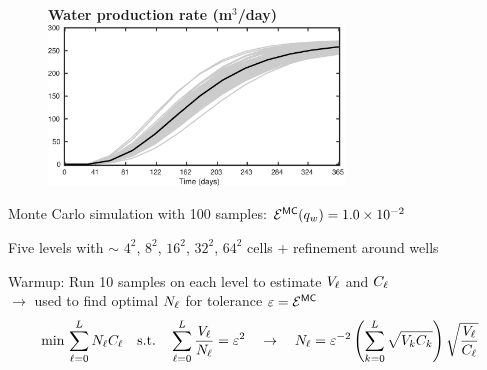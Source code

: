 \begin{frame}{\name{}}
    \begin{figure}
        \centering
        \textbf{Water production rate (m$^3$/day)}
        \includegraphics[width = 0.7\textwidth]{figures/example-1/water-rate.eps}
    \end{figure}
    \begin{squarelist}
        \item Monte Carlo simulation with 100 samples: $\mathcal{E}^{\mathsf{MC}}(q_w) = 1.0\times10^{-2}$
    \end{squarelist}
\end{frame}

\begin{frame}{\name{}}
    \begin{figure}
        \centering
    \end{figure}
    \begin{squarelist}
        \item<1-> Five levels with $\sim$ $4^2$, $8^2$, $16^2$, $32^2$, $64^2$ cells + refinement around wells
        \item<2-> Warmup: Run 10 samples on each level to estimate $V_\ell$ and $C_\ell$ \\
        $\rightarrow$ used to find optimal $N_\ell$ for tolerance $\varepsilon = \mathcal{E}^{{\mathsf{MC}}}$
        \begin{equation*}
            \min\, \sum_{\ell = 0}^L N_\ell C_\ell \quad \text{s.t.} \quad \sum_{\ell = 0}^L\frac{V_\ell}{N_\ell} = \varepsilon^2 \quad \rightarrow \quad N_\ell = \varepsilon^{-2}\left(\sum_{k = 0}^L \sqrt{V_k C_k}\right)\sqrt{\frac{V_\ell}{C_\ell}}
        \end{equation*}
    \end{squarelist}
\end{frame}

